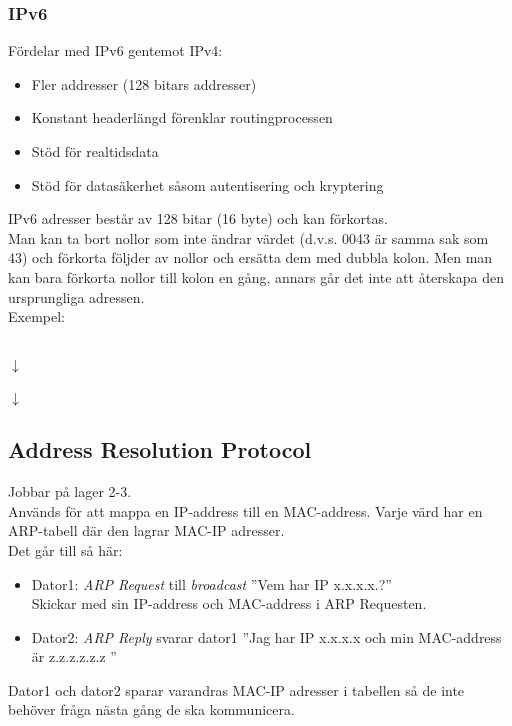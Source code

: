 \documentclass[11pt]{article}
\begin{document}
\subsubsection{IPv6}
Fördelar med IPv6 gentemot IPv4:
\begin{itemize}
\item{Fler addresser (128 bitars addresser)}
\item{Konstant headerlängd förenklar routingprocessen}
\item{Stöd för realtidsdata}
\item{Stöd för datasäkerhet såsom autentisering och kryptering}
\end{itemize}
IPv6 adresser består av 128 bitar (16 byte) och kan förkortas. \\
Man kan ta bort nollor som inte ändrar värdet (d.v.s. 0043 är samma sak som 43) och förkorta följder av nollor och ersätta dem med dubbla kolon. Men man kan bara förkorta nollor till kolon en gång, annars går det inte att återskapa den ursprungliga adressen. \\
Exempel:
\begin{center}
 \\
$\downarrow$ \\
 \\
$\downarrow$ \\
\end{center}

\subsection{Address Resolution Protocol}
Jobbar på lager 2-3. \\
Används för att mappa en IP-address till en MAC-address. Varje värd har en ARP-tabell där den lagrar MAC-IP adresser. \\
Det går till så här:
\begin{itemize}
\item{Dator1: \emph{ARP Request} till \emph{broadcast} ''Vem har IP x.x.x.x.?''\\
	Skickar med sin IP-address och MAC-address i ARP Requesten.}
\item{Dator2: \emph{ARP Reply} svarar dator1 ''Jag har IP x.x.x.x och min MAC-address är z.z.z.z.z.z ''}
\end{itemize}
Dator1 och dator2 sparar varandras MAC-IP adresser i tabellen så de inte behöver fråga nästa gång de ska kommunicera.
\end{document}
